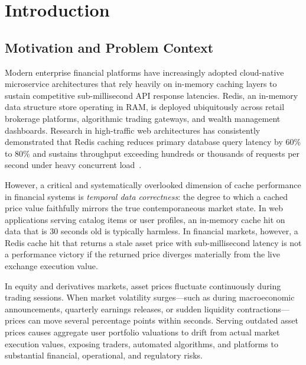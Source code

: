 \documentclass[11pt,a4paper]{article}
\begin{document}
\vspace{1.5em}

\section{Introduction}
\label{sec:intro}

\subsection{Motivation and Problem Context}

Modern enterprise financial platforms have increasingly adopted cloud-native microservice architectures that rely heavily on in-memory caching layers to sustain competitive sub-millisecond API response latencies. Redis, an in-memory data structure store operating in RAM, is deployed ubiquitously across retail brokerage platforms, algorithmic trading gateways, and wealth management dashboards. Research in high-traffic web architectures has consistently demonstrated that Redis caching reduces primary database query latency by 60\% to 80\% and sustains throughput exceeding hundreds or thousands of requests per second under heavy concurrent load~\cite{kaptosv2025,barton2026,deshpande2025}.

However, a critical and systematically overlooked dimension of cache performance in financial systems is \textit{temporal data correctness}: the degree to which a cached price value faithfully mirrors the true contemporaneous market state. In web applications serving catalog items or user profiles, an in-memory cache hit on data that is 30 seconds old is typically harmless. In financial markets, however, a Redis cache hit that returns a stale asset price with sub-millisecond latency is not a performance victory if the returned price diverges materially from the live exchange execution value. 

In equity and derivatives markets, asset prices fluctuate continuously during trading sessions. When market volatility surges---such as during macroeconomic announcements, quarterly earnings releases, or sudden liquidity contractions---prices can move several percentage points within seconds. Serving outdated asset prices causes aggregate user portfolio valuations to drift from actual market execution values, exposing traders, automated algorithms, and platforms to substantial financial, operational, and regulatory risks. 
\end{document}

